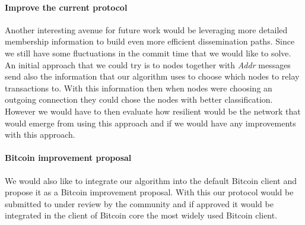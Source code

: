 \paragraph*{Improve the current protocol} Another interesting avenue for future work would be leveraging more detailed membership information to build even more efficient dissemination paths. Since we still have some fluctuations in the commit time that we would like to solve. An initial approach that we could try is to nodes together with \textsl{Addr} messages send also the information that our algorithm uses to choose which nodes to relay transactions to. With this information then when nodes were choosing an outgoing connection they could chose the nodes with better classification. However we would have to then evaluate how resilient would be the network that would emerge from using this approach and if we would have any improvements with this approach. 

\paragraph*{Bitcoin improvement proposal} We would also like to integrate our algorithm into the default Bitcoin client and propose it as a Bitcoin improvement proposal. With this our protocol would be submitted to under review by the community and if approved it would be integrated in the client of Bitcoin core the most widely used Bitcoin client.








